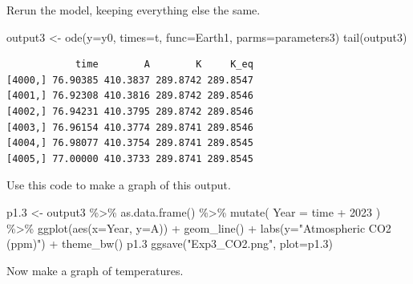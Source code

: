 \documentclass[
  letterpaper,
  DIV=11,
  numbers=noendperiod]{scrreprt}
\newenvironment{Shaded}{\begin{snugshade}}{\end{snugshade}}
\newcommand{\AttributeTok}[1]{\textcolor[rgb]{0.40,0.45,0.13}{#1}}
\newcommand{\DecValTok}[1]{\textcolor[rgb]{0.68,0.00,0.00}{#1}}
\newcommand{\FloatTok}[1]{\textcolor[rgb]{0.68,0.00,0.00}{#1}}
\newcommand{\FunctionTok}[1]{\textcolor[rgb]{0.28,0.35,0.67}{#1}}
\newcommand{\NormalTok}[1]{\textcolor[rgb]{0.00,0.23,0.31}{#1}}
\newcommand{\OtherTok}[1]{\textcolor[rgb]{0.00,0.23,0.31}{#1}}
\newcommand{\SpecialCharTok}[1]{\textcolor[rgb]{0.37,0.37,0.37}{#1}}
\newcommand{\StringTok}[1]{\textcolor[rgb]{0.13,0.47,0.30}{#1}}
\begin{document}
Rerun the model, keeping everything else the same.

\begin{Shaded}
\begin{Highlighting}[]
\NormalTok{output3 }\OtherTok{\textless{}{-}} \FunctionTok{ode}\NormalTok{(}\AttributeTok{y=}\NormalTok{y0, }\AttributeTok{times=}\NormalTok{t, }\AttributeTok{func=}\NormalTok{Earth1, }\AttributeTok{parms=}\NormalTok{parameters3)}
\FunctionTok{tail}\NormalTok{(output3)}
\end{Highlighting}
\end{Shaded}

\begin{verbatim}
            time        A        K     K_eq
[4000,] 76.90385 410.3837 289.8742 289.8547
[4001,] 76.92308 410.3816 289.8742 289.8546
[4002,] 76.94231 410.3795 289.8742 289.8546
[4003,] 76.96154 410.3774 289.8741 289.8546
[4004,] 76.98077 410.3754 289.8741 289.8545
[4005,] 77.00000 410.3733 289.8741 289.8545
\end{verbatim}

Use this code to make a graph of this output.

\begin{Shaded}
\begin{Highlighting}[]
\NormalTok{p1}\FloatTok{.3} \OtherTok{\textless{}{-}}\NormalTok{ output3 }\SpecialCharTok{\%\textgreater{}\%} \FunctionTok{as.data.frame}\NormalTok{() }\SpecialCharTok{\%\textgreater{}\%}
  \FunctionTok{mutate}\NormalTok{(}
    \AttributeTok{Year =}\NormalTok{ time }\SpecialCharTok{+} \DecValTok{2023}
\NormalTok{  ) }\SpecialCharTok{\%\textgreater{}\%}
  \FunctionTok{ggplot}\NormalTok{(}\FunctionTok{aes}\NormalTok{(}\AttributeTok{x=}\NormalTok{Year, }\AttributeTok{y=}\NormalTok{A)) }\SpecialCharTok{+} 
  \FunctionTok{geom\_line}\NormalTok{() }\SpecialCharTok{+} \FunctionTok{labs}\NormalTok{(}\AttributeTok{y=}\StringTok{"Atmospheric CO2 (ppm)"}\NormalTok{) }\SpecialCharTok{+}
  \FunctionTok{theme\_bw}\NormalTok{()}
\NormalTok{p1}\FloatTok{.3}
\FunctionTok{ggsave}\NormalTok{(}\StringTok{"Exp3\_CO2.png"}\NormalTok{, }\AttributeTok{plot=}\NormalTok{p1}\FloatTok{.3}\NormalTok{)}
\end{Highlighting}
\end{Shaded}

Now make a graph of temperatures.
\end{document}

